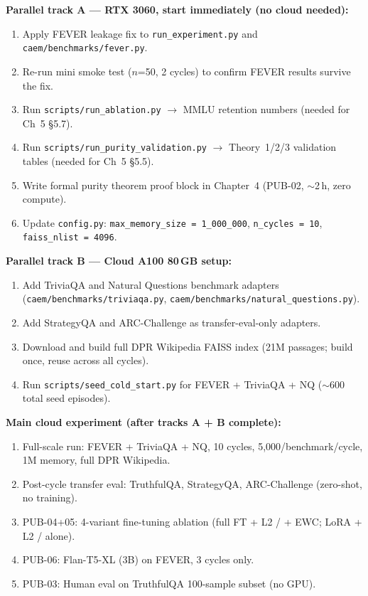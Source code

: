 \documentclass[12pt,a4paper]{article}
\begin{document}
\begin{mdframed}[style=infobox]
\textbf{Parallel track A --- RTX 3060, start immediately (no cloud needed):}
\begin{enumerate}[noitemsep]
  \item Apply FEVER leakage fix to \texttt{run\_experiment.py} and
        \texttt{caem/benchmarks/fever.py}.
  \item Re-run mini smoke test ($n$=50, 2 cycles) to confirm FEVER results
        survive the fix.
  \item Run \texttt{scripts/run\_ablation.py} $\to$ MMLU retention numbers
        (needed for Ch~5 \S5.7).
  \item Run \texttt{scripts/run\_purity\_validation.py} $\to$ Theory~1/2/3
        validation tables (needed for Ch~5 \S5.5).
  \item Write formal purity theorem proof block in Chapter~4 (PUB-02,
        $\sim$2\,h, zero compute).
  \item Update \texttt{config.py}:
        \texttt{max\_memory\_size = 1\_000\_000},
        \texttt{n\_cycles = 10},
        \texttt{faiss\_nlist = 4096}.
\end{enumerate}

\textbf{Parallel track B --- Cloud A100 80\,GB setup:}
\begin{enumerate}[noitemsep]
  \item Add TriviaQA and Natural Questions benchmark adapters
        (\texttt{caem/benchmarks/triviaqa.py},
         \texttt{caem/benchmarks/natural\_questions.py}).
  \item Add StrategyQA and ARC-Challenge as transfer-eval-only adapters.
  \item Download and build full DPR Wikipedia FAISS index
        (21M passages; build once, reuse across all cycles).
  \item Run \texttt{scripts/seed\_cold\_start.py} for FEVER + TriviaQA + NQ
        ($\sim$600 total seed episodes).
\end{enumerate}

\textbf{Main cloud experiment (after tracks A + B complete):}
\begin{enumerate}[noitemsep]
  \item Full-scale run: FEVER + TriviaQA + NQ, 10 cycles, 5,000/benchmark/cycle,
        1M memory, full DPR Wikipedia.
  \item Post-cycle transfer eval: TruthfulQA, StrategyQA, ARC-Challenge
        (zero-shot, no training).
  \item PUB-04+05: 4-variant fine-tuning ablation (full FT + L2 / + EWC;
        LoRA + L2 / alone).
  \item PUB-06: Flan-T5-XL (3B) on FEVER, 3 cycles only.
  \item PUB-03: Human eval on TruthfulQA 100-sample subset (no GPU).
\end{enumerate}


\end{mdframed}
\end{document}
